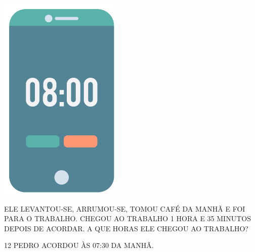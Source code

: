 
\begin{minipage}{.4\textwidth}
\includegraphics[width=.3\textwidth]{../ilustracoes/MAT1/SAEB_1ANO_MAT_FIGURA57.png}
\end{minipage}
\begin{minipage}{.6\textwidth}
ELE LEVANTOU-SE, ARRUMOU-SE, TOMOU CAFÉ DA MANHÃ E FOI PARA O TRABALHO. CHEGOU AO TRABALHO 1 HORA E 35 MINUTOS DEPOIS DE ACORDAR. A QUE HORAS ELE CHEGOU AO TRABALHO?
\end{minipage}\bigskip\bigskip


\pagebreak
\num{12} PEDRO ACORDOU ÀS 07:30 DA MANHÃ.


